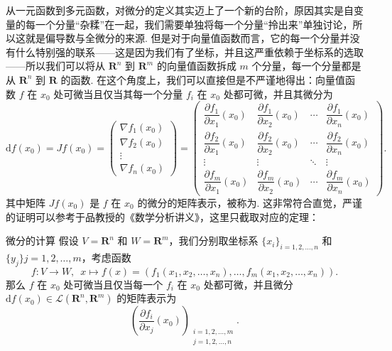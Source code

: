 从一元函数到多元函数，对微分的定义其实迈上了一个新的台阶，原因其实是自变量的每一个分量``杂糅''在一起，我们需要单独将每一个分量``拎出来''单独讨论，所以这就是偏导数与全微分的来源. 但是对于向量值函数而言，它的每一个分量并没有什么特别强的联系——这是因为我们有了坐标，并且这严重依赖于坐标系的选取——所以我们可以将从 $\mathbf{R}^n$ 到 $\mathbf{R}^m$ 的向量值函数拆成 $m$ 个分量，每一个分量都是从 $\mathbf{R}^n$ 到 $\mathbf{R}$ 的函数. 在这个角度上，我们可以直接但是不严谨地得出：向量值函数 $f$ 在 $x_0$ 处可微当且仅当其每一个分量 $f_i$ 在 $x_0$ 处都可微，并且其微分为
\[
    \mathrm{d}f(x_0) = Jf(x_0) =
    \begin{pmatrix} \nabla f_1(x_0) \\ \nabla f_2(x_0) \\ \vdots \\ \nabla f_n(x_0) \end{pmatrix} =
    \begin{pmatrix}
        \dfrac{\partial f_1}{\partial x_1}(x_0) & \dfrac{\partial f_1}{\partial x_2}(x_0) & \cdots & \dfrac{\partial f_1}{\partial x_n}(x_0) \\[2ex]
        \dfrac{\partial f_2}{\partial x_1}(x_0) & \dfrac{\partial f_2}{\partial x_2}(x_0) & \cdots & \dfrac{\partial f_2}{\partial x_n}(x_0) \\[2ex]
        \vdots                                  & \vdots                                  & \ddots & \vdots                                  \\[2ex]
        \dfrac{\partial f_m}{\partial x_1}(x_0) & \dfrac{\partial f_m}{\partial x_2}(x_0) & \cdots & \dfrac{\partial f_m}{\partial x_n}(x_0)
    \end{pmatrix}.
\]
其中矩阵 $Jf(x_0)$ 是 $f$ 在 $x_0$ 的微分的矩阵表示，被称为. 这非常符合直觉，严谨的证明可以参考于品教授的《数学分析讲义》，这里只截取对应的定理：

\begin{theorem}{微分的计算}{}
    假设 $V = \mathbf{R}^n$ 和 $W = \mathbf{R}^m$，我们分别取坐标系 $\{x_i\}_{i = 1, 2, \ldots, n}$ 和 $\{y_j\}{j = 1, 2, \ldots, m}$，考虑函数 \[f\colon V\to W,\enspace x\mapsto f(x) = (f_1(x_1, x_2, \ldots, x_n), \ldots, f_m(x_1, x_2, \ldots, x_n)).\]
    那么 $f$ 在 $x_0$ 处可微当且仅当每一个 $f_i$ 在 $x_0$ 处都可微，并且微分 $\mathrm{d}f(x_0)\in \mathcal{L}(\mathbf{R}^n, \mathbf{R}^m)$ 的矩阵表示为
    \[\left(\frac{\partial f_i}{\partial x_j}(x_0)\right)_{\substack{i = 1, 2, \ldots, m \\ j = 1, 2, \ldots, n}}.\]
\end{theorem}

